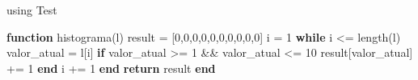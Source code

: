 \documentclass[
  letterpaper,
  DIV=11,
  numbers=noendperiod]{scrreprt}
\newenvironment{Shaded}{\begin{snugshade}}{\end{snugshade}}
\newcommand{\BuiltInTok}[1]{\textcolor[rgb]{0.00,0.23,0.31}{#1}}
\newcommand{\ControlFlowTok}[1]{\textcolor[rgb]{0.00,0.23,0.31}{\textbf{#1}}}
\newcommand{\FloatTok}[1]{\textcolor[rgb]{0.68,0.00,0.00}{#1}}
\newcommand{\FunctionTok}[1]{\textcolor[rgb]{0.28,0.35,0.67}{#1}}
\newcommand{\ImportTok}[1]{\textcolor[rgb]{0.00,0.46,0.62}{#1}}
\newcommand{\KeywordTok}[1]{\textcolor[rgb]{0.00,0.23,0.31}{\textbf{#1}}}
\newcommand{\NormalTok}[1]{\textcolor[rgb]{0.00,0.23,0.31}{#1}}
\newcommand{\OperatorTok}[1]{\textcolor[rgb]{0.37,0.37,0.37}{#1}}
\begin{document}
\begin{Shaded}
\begin{Highlighting}[]
\ImportTok{using} \BuiltInTok{Test}

\KeywordTok{function} \FunctionTok{histograma}\NormalTok{(l)}
\NormalTok{    result }\OperatorTok{=}\NormalTok{ [}\FloatTok{0}\NormalTok{,}\FloatTok{0}\NormalTok{,}\FloatTok{0}\NormalTok{,}\FloatTok{0}\NormalTok{,}\FloatTok{0}\NormalTok{,}\FloatTok{0}\NormalTok{,}\FloatTok{0}\NormalTok{,}\FloatTok{0}\NormalTok{,}\FloatTok{0}\NormalTok{,}\FloatTok{0}\NormalTok{]}
\NormalTok{    i }\OperatorTok{=} \FloatTok{1}
    \ControlFlowTok{while}\NormalTok{ i }\OperatorTok{\textless{}=} \FunctionTok{length}\NormalTok{(l)}
\NormalTok{        valor\_atual }\OperatorTok{=}\NormalTok{ l[i]}
        \ControlFlowTok{if}\NormalTok{ valor\_atual }\OperatorTok{\textgreater{}=} \FloatTok{1} \OperatorTok{\&\&}\NormalTok{ valor\_atual }\OperatorTok{\textless{}=} \FloatTok{10}
\NormalTok{           result[valor\_atual] }\OperatorTok{+=} \FloatTok{1}
        \ControlFlowTok{end}
\NormalTok{        i }\OperatorTok{+=} \FloatTok{1}
    \ControlFlowTok{end}
    \ControlFlowTok{return}\NormalTok{ result}
\KeywordTok{end}


\end{Highlighting}
\end{Shaded}
\end{document}

